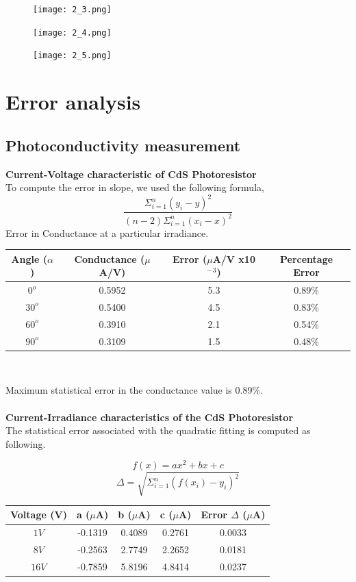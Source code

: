\documentclass[12pt]{report}
\begin{document}
\begin{figure}[h]
	\centering
	\texttt{[image: 2\_3.png]}
\end{figure}
\begin{figure}[h]
	\centering
	\texttt{[image: 2\_4.png]}
\end{figure}
\begin{figure}[h]
	\centering
	\texttt{[image: 2\_5.png]}
\end{figure}


\chapter{Error analysis}
\section{Photoconductivity measurement}
\textbf{Current-Voltage characteristic of CdS Photoresistor}\\
To compute the error in slope, we used the following formula,
\[\frac{\Sigma^n_{i=1}{(y_i-y)^2}}{(n-2)\Sigma^n_{i=1}{(x_i-x)^2}}\]
Error in Conductance at a particular irradiance.
\begin{center}
	\begin{tabular}{ |c|c|c|c| } 
		\hline
		Angle ($\alpha$) &  Conductance ($\mu$A/V) & Error ($\mu$A/V x10$^-$$^3$) & Percentage Error \\ 
		\hline
		$0^o$   & 0.5952 & 5.3 & 0.89\%\\
		$30^o$  & 0.5400 & 4.5 & 0.83\%\\
		$60^o$  & 0.3910 & 2.1 & 0.54\%\\
		$90^o$  & 0.3109 & 1.5 & 0.48\%\\
		\hline
	\end{tabular}
	\\
\end{center}
Maximum statistical error in the conductance value is 0.89\%.\\ \\
\textbf{Current-Irradiance characteristics of the CdS Photoresistor}\\
The statistical error associated with the quadratic fitting is computed as following.

\[f(x)=ax^2+bx+c\]
\[\Delta=\sqrt{\Sigma_{i=1}^n(f(x_i)-y_i)^2}\]

\begin{center}
	\begin{tabular}{ |c|c|c|c|c| } 
		\hline
		Voltage (V) &  a ($\mu$A) & b ($\mu$A) & c ($\mu$A) & Error $\Delta$ ($\mu$A)\\ 
		\hline
		$1V$  & -0.1319 & 0.4089 & 0.2761 & 0.0033\\
		$8V$  & -0.2563 & 2.7749 & 2.2652 & 0.0181\\
		$16V$ & -0.7859 & 5.8196 & 4.8414 & 0.0237\\
		\hline
	\end{tabular}
	\\
\end{center}
\end{document}
